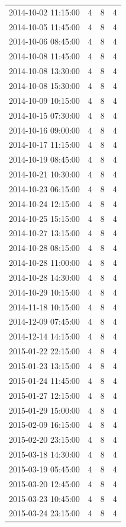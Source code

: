 \begin{tabular}{lrrr}
2014-10-02 11:15:00 & 4 & 8 & 4 \\
2014-10-05 11:45:00 & 4 & 8 & 4 \\
2014-10-06 08:45:00 & 4 & 8 & 4 \\
2014-10-08 11:45:00 & 4 & 8 & 4 \\
2014-10-08 13:30:00 & 4 & 8 & 4 \\
2014-10-08 15:30:00 & 4 & 8 & 4 \\
2014-10-09 10:15:00 & 4 & 8 & 4 \\
2014-10-15 07:30:00 & 4 & 8 & 4 \\
2014-10-16 09:00:00 & 4 & 8 & 4 \\
2014-10-17 11:15:00 & 4 & 8 & 4 \\
2014-10-19 08:45:00 & 4 & 8 & 4 \\
2014-10-21 10:30:00 & 4 & 8 & 4 \\
2014-10-23 06:15:00 & 4 & 8 & 4 \\
2014-10-24 12:15:00 & 4 & 8 & 4 \\
2014-10-25 15:15:00 & 4 & 8 & 4 \\
2014-10-27 13:15:00 & 4 & 8 & 4 \\
2014-10-28 08:15:00 & 4 & 8 & 4 \\
2014-10-28 11:00:00 & 4 & 8 & 4 \\
2014-10-28 14:30:00 & 4 & 8 & 4 \\
2014-10-29 10:15:00 & 4 & 8 & 4 \\
2014-11-18 10:15:00 & 4 & 8 & 4 \\
2014-12-09 07:45:00 & 4 & 8 & 4 \\
2014-12-14 14:15:00 & 4 & 8 & 4 \\
2015-01-22 22:15:00 & 4 & 8 & 4 \\
2015-01-23 13:15:00 & 4 & 8 & 4 \\
2015-01-24 11:45:00 & 4 & 8 & 4 \\
2015-01-27 12:15:00 & 4 & 8 & 4 \\
2015-01-29 15:00:00 & 4 & 8 & 4 \\
2015-02-09 16:15:00 & 4 & 8 & 4 \\
2015-02-20 23:15:00 & 4 & 8 & 4 \\
2015-03-18 14:30:00 & 4 & 8 & 4 \\
2015-03-19 05:45:00 & 4 & 8 & 4 \\
2015-03-20 12:45:00 & 4 & 8 & 4 \\
2015-03-23 10:45:00 & 4 & 8 & 4 \\
2015-03-24 23:15:00 & 4 & 8 & 4 \\

\end{tabular}
